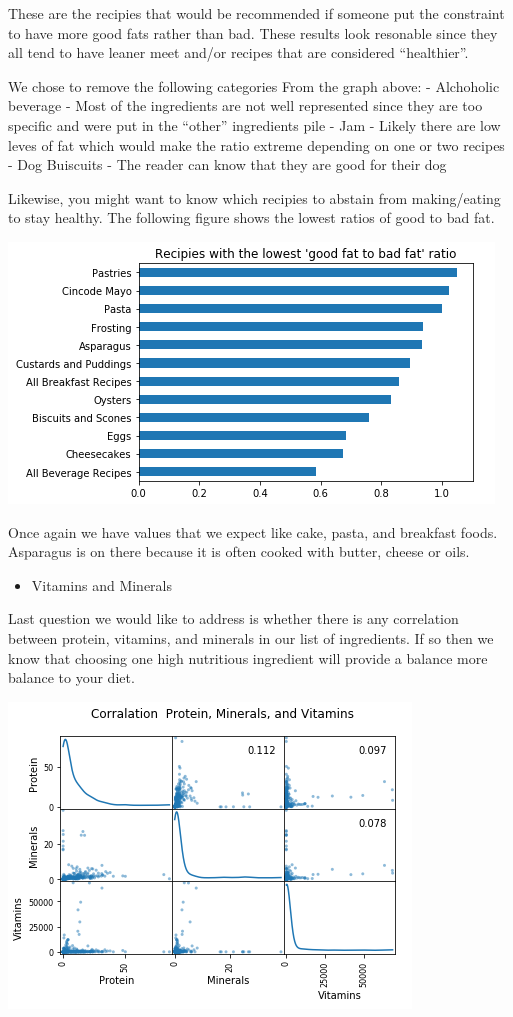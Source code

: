 \documentclass[11pt]{article}
\makeatletter
\def\maxwidth{\ifdim\Gin@nat@width>\linewidth\linewidth
    \else\Gin@nat@width\fi}
\let\Oldincludegraphics\includegraphics
\renewcommand{\includegraphics}[1]{\Oldincludegraphics[width=.8\maxwidth]{#1}}
\providecommand{\tightlist}{%
      \setlength{\itemsep}{0pt}\setlength{\parskip}{0pt}}
\makeatother
\begin{document}
These are the recipies that would be recommended if someone put the
constraint to have more good fats rather than bad. These results look
resonable since they all tend to have leaner meet and/or recipes that
are considered ``healthier''.

We chose to remove the following categories From the graph above: -
Alchoholic beverage - Most of the ingredients are not well represented
since they are too specific and were put in the ``other'' ingredients
pile - Jam - Likely there are low leves of fat which would make the
ratio extreme depending on one or two recipes - Dog Buiscuits - The
reader can know that they are good for their dog

Likewise, you might want to know which recipies to abstain from
making/eating to stay healthy. The following figure shows the lowest
ratios of good to bad fat.

\includegraphics{goodbad2.png}

Once again we have values that we expect like cake, pasta, and breakfast
foods. Asparagus is on there because it is often cooked with butter,
cheese or oils.

    \begin{itemize}
\tightlist
\item
  Vitamins and Minerals
\end{itemize}

Last question we would like to address is whether there is any
correlation between protein, vitamins, and minerals in our list of
ingredients. If so then we know that choosing one high nutritious
ingredient will provide a balance more balance to your diet.

\includegraphics{corr_m.png}
\end{document}
